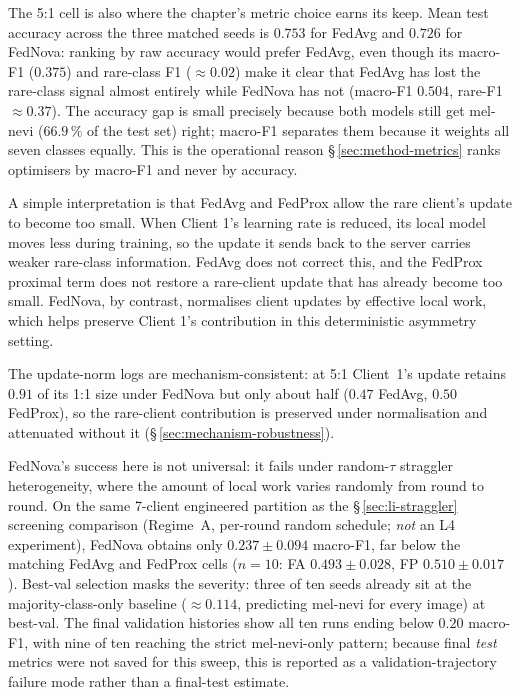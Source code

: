 \documentclass[11pt,a4paper]{report}
\begin{document}
The 5:1 cell is also where the chapter's metric choice earns its keep. Mean
test accuracy across the three matched seeds is $0.753$ for FedAvg and
$0.726$ for FedNova: ranking by raw accuracy would prefer FedAvg, even
though its macro-F1 ($0.375$) and rare-class F1 ($\approx 0.02$) make it
clear that FedAvg has lost the rare-class signal almost entirely while
FedNova has not (macro-F1 $0.504$, rare-F1 $\approx 0.37$). The accuracy
gap is small precisely because both models still get mel-nevi
($66.9\,\%$ of the test set) right; macro-F1 separates them because it
weights all seven classes equally. This is the operational reason \S\,\ref{sec:method-metrics}
ranks optimisers by macro-F1 and never by accuracy.

A simple interpretation is that FedAvg and FedProx allow the rare client's
update to become too small. When Client 1's learning rate is reduced, its
local model moves less during training, so the update it sends back to the
server carries weaker rare-class information. FedAvg does not correct this,
and the FedProx proximal term does not restore a rare-client update that has
already become too small. FedNova, by contrast, normalises client updates by
effective local work, which helps preserve Client 1's contribution in this
deterministic asymmetry setting.

The update-norm logs are mechanism-consistent: at 5:1 Client~1's update retains
$0.91$ of its 1:1 size under FedNova but only about half ($0.47$ FedAvg, $0.50$
FedProx), so the rare-client contribution is preserved under normalisation and
attenuated without it (\S\,\ref{sec:mechanism-robustness}).

FedNova's success here is not universal: it fails under random-$\tau$ straggler
heterogeneity, where the amount of local work varies randomly from round to
round. On the same 7-client engineered partition as the
\S\,\ref{sec:li-straggler} screening comparison (Regime~A, per-round random
schedule; \emph{not} an L4 experiment), FedNova obtains only
$0.237 \pm 0.094$ macro-F1, far below the matching FedAvg and FedProx cells
($n = 10$: FA $0.493 \pm 0.028$, FP $0.510 \pm 0.017$). Best-val selection masks
the severity: three of ten seeds already sit at the majority-class-only baseline
($\approx 0.114$, predicting mel-nevi for every image) at best-val. The final
validation histories show all ten runs ending below $0.20$ macro-F1, with nine of
ten reaching the strict mel-nevi-only pattern; because final \emph{test} metrics
were not saved for this sweep, this is reported as a validation-trajectory failure
mode rather than a final-test estimate.
\end{document}
